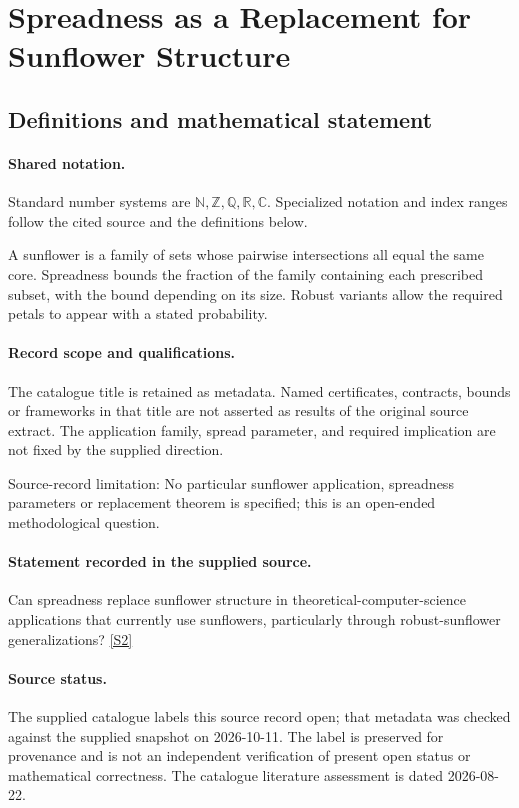 \documentclass[11pt]{article}
\newcommand{\sref}[2]{\hyperlink{source:#1:#2}{[S#2]}}
\begin{document}
\section{Spreadness as a Replacement for Sunflower Structure}\label{statement}

\subsection{Definitions and mathematical statement}

\paragraph{Shared notation.}Standard number systems are $\mathbb N,\mathbb Z,\mathbb Q,\mathbb R,\mathbb C$. Specialized notation and index ranges follow the cited source and the definitions below.


A sunflower is a family of sets whose pairwise intersections all equal the same core. Spreadness bounds the fraction of the family containing each prescribed subset, with the bound depending on its size. Robust variants allow the required petals to appear with a stated probability.
\paragraph{Record scope and qualifications.}
The catalogue title is retained as metadata. Named certificates, contracts, bounds or frameworks in that title are not asserted as results of the original source extract.
The application family, spread parameter, and required implication are not fixed by the supplied direction.

Source-record limitation: No particular sunflower application, spreadness parameters or replacement theorem is specified; this is an open-ended methodological question.
\paragraph{Statement recorded in the supplied source.}
Can spreadness replace sunflower structure in theoretical-computer-science applications that currently use sunflowers, particularly through robust-sunflower generalizations? \sref{statement}{2}
\paragraph{Source status.}
The supplied catalogue labels this source record open; that metadata was checked against the supplied snapshot on 2026-10-11. The label is preserved for provenance and is not an independent verification of present open status or mathematical correctness. The catalogue literature assessment is dated 2026-08-22.
\end{document}
